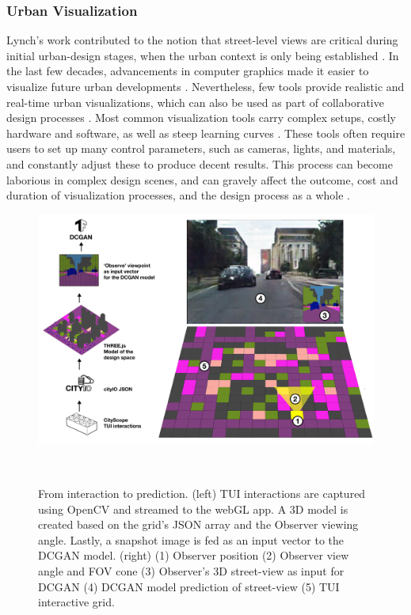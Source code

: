 {{        \subsubsection{Urban Visualization}
        {
            Lynch's work contributed to the notion that street-level views are critical during initial urban-design stages, when the urban context is only being established \cite{drettakis2007design, brusaporci2017importance}. In the last few decades, advancements in computer graphics made it easier to visualize future urban developments \cite{shiode20003d, kempenaar2016design}. Nevertheless, few tools provide realistic and real-time urban visualizations, which can also be used as part of collaborative design processes \cite{mueller2018citizen}.
            \newline
            Most common visualization tools carry complex setups, costly hardware and software, as well as steep learning curves \cite{yan2014evaluation, mekni2014augmented}. These tools often require users to set up many control parameters, such as cameras, lights, and materials, and constantly adjust these to produce decent results. This process can become laborious in complex design scenes, and can gravely affect the outcome, cost and duration of visualization processes, and the design process as a whole \cite{lovett2015using}.
        }
    }


    \begin{figure}[!htb]
        \centering
        \includegraphics[width=1\columnwidth]{chapters/prediction/deepscope/figures/deepscope3.png}
        \caption{From interaction to prediction. (left) TUI interactions are captured using OpenCV and streamed to the webGL app. A 3D model is created based on the grid's JSON array and the Observer viewing angle. Lastly, a snapshot image is fed as an input vector to the DCGAN model. (right) (1) Observer position (2) Observer view angle and FOV cone (3) Observer's 3D street-view as input for DCGAN (4) DCGAN model prediction of street-view (5) TUI interactive grid.}~\label{fig:deepscope_dataflow}
    \end{figure}



}
